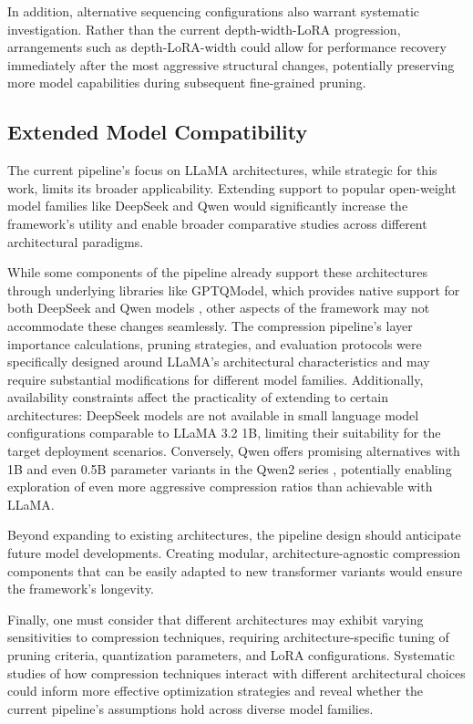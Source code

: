 In addition, alternative sequencing configurations also warrant systematic investigation. Rather than the current depth-width-LoRA progression, arrangements such as depth-LoRA-width could allow for performance recovery immediately after the most aggressive structural changes, potentially preserving more model capabilities during subsequent fine-grained pruning.

\subsection{Extended Model Compatibility}
The current pipeline's focus on LLaMA architectures, while strategic for this work, limits its broader applicability. Extending support to popular open-weight model families like DeepSeek \cite{deepseek} and Qwen \cite{qwen} would significantly increase the framework's utility and enable broader comparative studies across different architectural paradigms.

While some components of the pipeline already support these architectures through underlying libraries like GPTQModel, which provides native support for both DeepSeek and Qwen models \cite{gptqmodel}, other aspects of the framework may not accommodate these changes seamlessly. The compression pipeline's layer importance calculations, pruning strategies, and evaluation protocols were specifically designed around LLaMA's architectural characteristics and may require substantial modifications for different model families. Additionally, availability constraints affect the practicality of extending to certain architectures: DeepSeek models are not available in small language model configurations comparable to LLaMA 3.2 1B, limiting their suitability for the target deployment scenarios. Conversely, Qwen offers promising alternatives with 1B and even 0.5B parameter variants in the Qwen2 series \cite{qwen2}, potentially enabling exploration of even more aggressive compression ratios than achievable with LLaMA.

Beyond expanding to existing architectures, the pipeline design should anticipate future model developments. Creating modular, architecture-agnostic compression components that can be easily adapted to new transformer variants would ensure the framework's longevity.

Finally, one must consider that different architectures may exhibit varying sensitivities to compression techniques, requiring architecture-specific tuning of pruning criteria, quantization parameters, and LoRA configurations. Systematic studies of how compression techniques interact with different architectural choices could inform more effective optimization strategies and reveal whether the current pipeline's assumptions hold across diverse model families.

